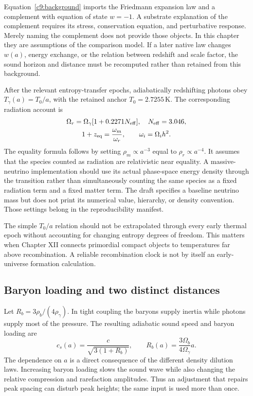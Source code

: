 Equation~\eqref{c9:background} imports the Friedmann expansion law and a complement with equation of state $w=-1$. A substrate explanation of the complement requires its stress, conservation equation, and perturbative response. Merely naming the complement does not provide those objects. In this chapter they are assumptions of the comparison model. If a later native law changes $w(a)$, energy exchange, or the relation between redshift and scale factor, the sound horizon and distance must be recomputed rather than retained from this background.

After the relevant entropy-transfer epochs, adiabatically redshifting photons obey $T_\gamma(a)=T_0/a$, with the retained anchor $T_0=2.7255\,\mathrm K$. The corresponding radiation account is
\begin{equation}
 \begin{gathered}
 \Omega_r=\Omega_\gamma[1+0.2271N_{\rm eff}],\quad N_{\rm eff}=3.046,\\
 1+z_{\rm eq}=\frac{\omega_m}{\omega_r},\qquad \omega_i=\Omega_i h^2.
 \end{gathered}
\label{c9:radiation}
\end{equation}
The equality formula follows by setting $\rho_m\propto a^{-3}$ equal to $\rho_r\propto a^{-4}$. It assumes that the species counted as radiation are relativistic near equality. A massive-neutrino implementation should use its actual phase-space energy density through the transition rather than simultaneously counting the same species as a fixed radiation term and a fixed matter term. The draft specifies a baseline neutrino mass but does not print its numerical value, hierarchy, or density convention. Those settings belong in the reproducibility manifest.

The simple $T_0/a$ relation should not be extrapolated through every early thermal epoch without accounting for changing entropy degrees of freedom. This matters when Chapter XII connects primordial compact objects to temperatures far above recombination. A reliable recombination clock is not by itself an early-universe formation calculation.

\subsection{Baryon loading and two distinct distances}

Let $R_b=3\rho_b/(4\rho_\gamma)$. In tight coupling the baryons supply inertia while photons supply most of the pressure. The resulting adiabatic sound speed and baryon loading are
\begin{equation}
 c_s(a)=\frac{c}{\sqrt{3(1+R_b)}},\qquad
 R_b(a)=\frac{3\Omega_b}{4\Omega_\gamma}a.
\label{c9:soundspeed}
\end{equation}
The dependence on $a$ is a direct consequence of the different density dilution laws. Increasing baryon loading slows the sound wave while also changing the relative compression and rarefaction amplitudes. Thus an adjustment that repairs peak spacing can disturb peak heights; the same input is used more than once.

